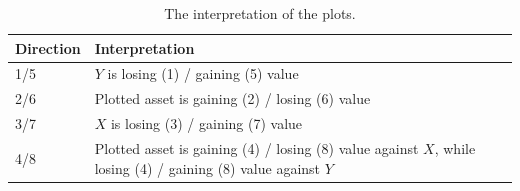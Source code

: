 \begin{table}[t]
\centering
\begin{tabular}{|l|l|}
\hline
\textbf{Direction} & \textbf{Interpretation}   \\ \hline

         1/5                & $Y$ is losing (1) / gaining (5) value \\ \hline
         2/6                & Plotted asset is gaining (2) / losing (6) value \\ \hline
         3/7                & $X$ is losing (3) / gaining (7) value \\ \hline
         4/8                & \multicolumn{1}{p{12cm}|}{Plotted asset is gaining (4) / losing (8) value against $X$, while losing (4) / gaining (8) value against $Y$} \\ \hline

\end{tabular}
\vspace{1em}
\caption{\footnotesize{The interpretation of the plots.}\label{tab:plotlegend}}
\end{table}




